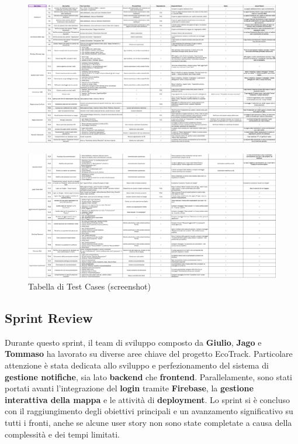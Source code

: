 \begin{figure}[H]
    \centering
    \includegraphics[width=1\linewidth]{D4-G1//Img/Screenshot 2025-06-10 at 18.19.58.png}
    \label{fig:enter-label}
\end{figure}
\begin{figure}[H]
    \centering
    \includegraphics[width=1\linewidth]{D4-G1//Img/Screenshot 2025-06-10 at 18.20.20.png}
    \caption{Tabella di Test Cases (screenshot)}
    \label{fig:enter-label}
\end{figure}


\subsection{Sprint Review}
Durante questo sprint, il team di sviluppo composto da \textbf{Giulio}, \textbf{Jago} e \textbf{Tommaso} ha lavorato su diverse aree chiave del progetto EcoTrack. Particolare attenzione è stata dedicata allo sviluppo e perfezionamento del sistema di \textbf{gestione notifiche}, sia lato \textbf{backend} che \textbf{frontend}. Parallelamente, sono stati portati avanti l’integrazione del \textbf{login} tramite \textbf{Firebase}, la\textbf{ gestione interattiva della mappa} e le attività di \textbf{deployment}. Lo sprint si è concluso con il raggiungimento degli obiettivi principali e un avanzamento significativo su tutti i fronti, anche se alcune user story non sono state completate a causa della complessità e dei tempi limitati. 

